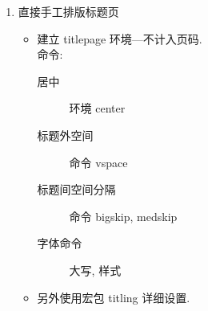 \documentclass[UTF8]{ctexart}
\begin{document}
\begin{enumerate}
                \item 直接手工排版标题页
                \begin{itemize}
                    \item 建立 titlepage 环境---不计入页码.\\
                        命令: 
                    \begin{description}
                        \item[居中] 环境 center
                        \item[标题外空间] 命令 vspace
                        \item[标题间空间分隔] 命令 bigskip, medskip
                        \item[字体命令] 大写, 样式   
                    \end{description}
                    \item 另外使用宏包 titling 详细设置. 
                \end{itemize}

            \end{enumerate}
\end{document}
